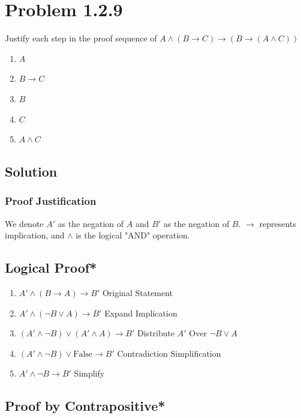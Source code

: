 \documentclass[12pt]{article}
\begin{document}
\newpage
\section*{Problem 1.2.9}
Justify each step in the proof sequence of $A \land (B \rightarrow C) \rightarrow (B \rightarrow (A \land C))$
\begin{enumerate}
\item $A$ \hfill
\item $B \rightarrow C$ \hfill
\item $B$ \hfill
\item $C$ \hfill
\item $A \land C$ \hfill
\end{enumerate}


\newpage
\subsection*{Solution}
\subsubsection*{Proof Justification}

We denote \( A' \) as the negation of \( A \) and \( B' \) as the negation of \( B \). \( \to \) represents implication, and \( \land \) is the logical "AND" operation.

\subsection*{Logical Proof*}

\begin{enumerate}
    \item \( A' \land (B \to A) \to B' \) \hfill Original Statement
    
    \item \( A' \land (\lnot B \lor A) \to B' \) \hfill Expand Implication
    
    \item \( (A' \land \lnot B) \lor (A' \land A) \to B' \) \hfill Distribute \( A' \) Over \( \lnot B \lor A \)
    
    \item \( (A' \land \lnot B) \lor \text{False} \to B' \) \hfill Contradiction Simplification
    
    \item \( A' \land \lnot B \to B' \) \hfill Simplify
\end{enumerate}

\subsection*{Proof by Contrapositive*}
\end{document}
